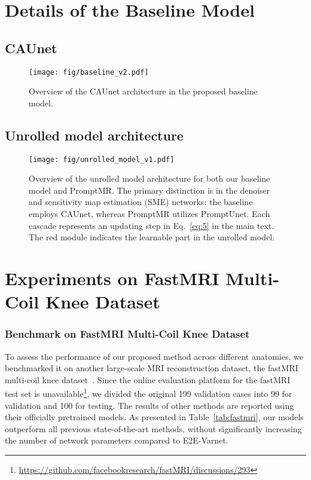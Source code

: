 \documentclass[runningheads]{llncs}
\begin{document}
{


\section{Details of the Baseline Model}
\label{app:baseline}

\subsection{CAUnet}
\label{app:ca-unet}


\begin{figure*}[ht]
\centering
\texttt{[image: fig/baseline\_v2.pdf]}
\caption{Overview of the CAUnet architecture in the proposed baseline model.}
\label{fig:baseline}
\end{figure*}

\subsection{Unrolled model architecture}
\label{app:unrolled_model}



\begin{figure*}[ht]
\centering
\texttt{[image: fig/unrolled\_model\_v1.pdf]}
\caption{Overview of the unrolled model architecture for both our baseline model and PromptMR. The primary distinction is in the denoiser  and sensitivity map estimation (SME) networks: the baseline employs CAUnet, whereas PromptMR utilizes PromptUnet. Each cascade represents an updating step in Eq.~\ref{eq:5} in the main text. The red module indicates the learnable part in the unrolled model.}
\label{fig:unroll}
\end{figure*}

\section{Experiments on FastMRI Multi-Coil Knee Dataset}
\label{app:add_exp}
\subsubsection{Benchmark on FastMRI Multi-Coil Knee Dataset}
To assess the performance of our proposed method across different anatomies, we benchmarked it on another large-scale MRI reconstruction dataset, the fastMRI multi-coil knee dataset~\cite{zbontar2018fastmri}. Since the online evaluation platform for the fastMRI test set is unavailable\setcounter{footnote}{0}\footnote{\url{https://github.com/facebookresearch/fastMRI/discussions/293}}, we divided the original 199 validation cases into 99 for validation and 100 for testing. The results of other methods are reported using their officially pretrained models. As presented in Table~\ref{tab:fastmri}, our models outperform all previous state-of-the-art methods, without significantly increasing the number of network parameters compared to E2E-Varnet.\\

}
\end{document}
